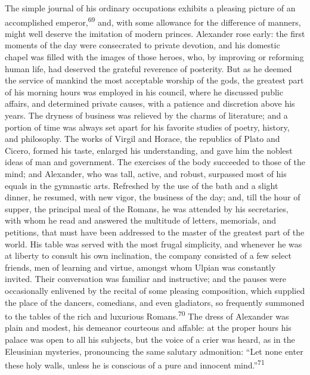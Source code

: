 The simple journal of his ordinary occupations exhibits a
pleasing picture of an accomplished emperor,\textsuperscript{69} and, with some
allowance for the difference of manners, might well deserve the
imitation of modern princes. Alexander rose early: the first
moments of the day were consecrated to private devotion, and his
domestic chapel was filled with the images of those heroes, who,
by improving or reforming human life, had deserved the grateful
reverence of posterity. But as he deemed the service of mankind
the most acceptable worship of the gods, the greatest part of his
morning hours was employed in his council, where he discussed
public affairs, and determined private causes, with a patience
and discretion above his years. The dryness of business was
relieved by the charms of literature; and a portion of time was
always set apart for his favorite studies of poetry, history, and
philosophy. The works of Virgil and Horace, the republics of
Plato and Cicero, formed his taste, enlarged his understanding,
and gave him the noblest ideas of man and government. The
exercises of the body succeeded to those of the mind; and
Alexander, who was tall, active, and robust, surpassed most of
his equals in the gymnastic arts. Refreshed by the use of the
bath and a slight dinner, he resumed, with new vigor, the
business of the day; and, till the hour of supper, the principal
meal of the Romans, he was attended by his secretaries, with whom
he read and answered the multitude of letters, memorials, and
petitions, that must have been addressed to the master of the
greatest part of the world. His table was served with the most
frugal simplicity, and whenever he was at liberty to consult his
own inclination, the company consisted of a few select friends,
men of learning and virtue, amongst whom Ulpian was constantly
invited. Their conversation was familiar and instructive; and the
pauses were occasionally enlivened by the recital of some
pleasing composition, which supplied the place of the dancers,
comedians, and even gladiators, so frequently summoned to the
tables of the rich and luxurious Romans.\textsuperscript{70} The dress of
Alexander was plain and modest, his demeanor courteous and
affable: at the proper hours his palace was open to all his
subjects, but the voice of a crier was heard, as in the
Eleusinian mysteries, pronouncing the same salutary admonition:
“Let none enter these holy walls, unless he is conscious of a
pure and innocent mind.”\textsuperscript{71}


